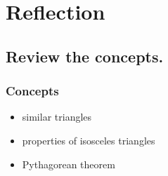 \documentclass{beamer} %
\begin{document}

\section{Reflection}

\subsection*{Review the concepts.}

\begin{frame}
  \frametitle{Concepts}
  \pause
  \begin{itemize}
    \item similar triangles \pause
    \item properties of isosceles triangles \pause
    \item Pythagorean theorem
  \end{itemize}
\end{frame}

\begin{comment}
\subsection*{A message from Tim.}

\tcbset{colframe=ml3}

\begin{frame}
  \begin{center}
    \begin{figure}
      \tcbox{\texttt{[image: sanders.png]}}
      ``Hi everybody, this is Tim.''
    \end{figure}
  \end{center}
\end{frame}
\end{comment}
\end{document}
